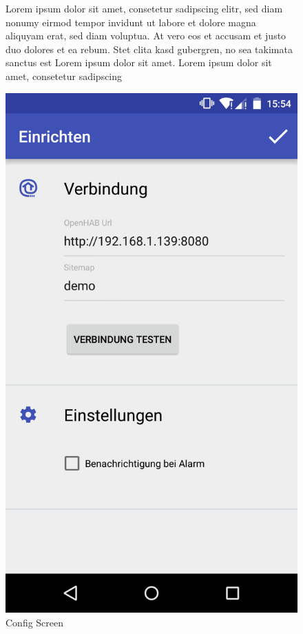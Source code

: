 \begin{figure}[htbp]
	\begin{minipage}{0.6\textwidth} 
Lorem ipsum dolor sit amet, consetetur sadipscing elitr, sed diam nonumy eirmod tempor invidunt ut labore et dolore magna aliquyam erat, sed diam voluptua. At vero eos et accusam et justo duo dolores et ea rebum. Stet clita kasd gubergren, no sea takimata sanctus est Lorem ipsum dolor sit amet. Lorem ipsum dolor sit amet, consetetur sadipscing 
	\end{minipage}
	\hfill
	\begin{minipage}{0.32\textwidth}
		\includegraphics[scale=0.12]{appendix/img/AppScreenshots/Screenshot2}
		\caption{Config Screen}
		\label{fig:screenshot_2}
	\end{minipage}
\end{figure}

